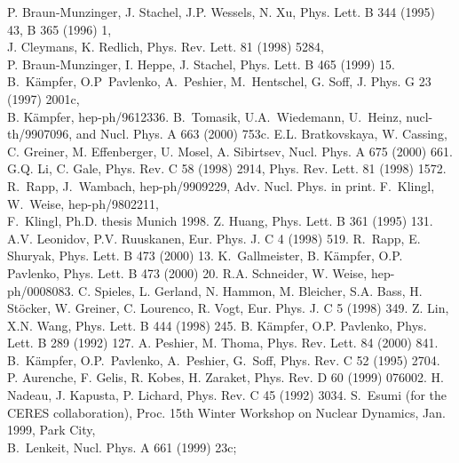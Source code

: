 \begin{thebibliography}{99}
\itemsep=0cm
P. Braun-Munzinger, J. Stachel, J.P. Wessels,
N. Xu, Phys. Lett. B 344 (1995) 43, B 365 (1996) 1,\\
J. Cleymans, K. Redlich, Phys. Rev. Lett. 81 (1998) 5284,\\
P. Braun-Munzinger, I. Heppe, J. Stachel, 
Phys. Lett. B 465 (1999) 15.
B.~K\"ampfer, O.P~Pavlenko, A.~Peshier, M.~Hentschel,
G. Soff, J. Phys. G 23 (1997) 2001c,\\
B. K\"ampfer, hep-ph/9612336.
B.~Tomasik, U.A.~Wiedemann, U.~Heinz, nucl-th/9907096,
and Nucl. Phys. A 663 (2000) 753c.
E.L. Bratkovskaya, W. Cassing, C. Greiner,
M. Effenberger, U. Mosel, A. Sibirtsev, Nucl. Phys. A 675 (2000) 661. 
 G.Q. Li, C. Gale, Phys. Rev. C 58 (1998) 2914,
Phys. Rev. Lett. 81 (1998) 1572.
R.~Rapp, J.~Wambach, hep-ph/9909229, Adv. Nucl. Phys. in print.
F.~Klingl, W.~Weise, hep-ph/9802211,\\
F.~Klingl, Ph.D. thesis Munich 1998.
Z. Huang, Phys. Lett. B 361 (1995) 131.
A.V. Leonidov, P.V. Ruuskanen, 
Eur. Phys. J. C 4 (1998) 519.
R.~Rapp, E. Shuryak, Phys. Lett. B 473 (2000) 13. 
K.~Gallmeister, B. K\"ampfer, O.P. Pavlenko, 
Phys. Lett. B 473 (2000) 20.
 R.A. Schneider, W. Weise, hep-ph/0008083.
C. Spieles, L. Gerland, N. Hammon, M. Bleicher, S.A. Bass,
H. St\"ocker, W. Greiner, C. Lourenco, R. Vogt, 
Eur. Phys. J. C 5 (1998) 349.
Z. Lin, X.N. Wang, Phys. Lett. B 444 (1998) 245. 
B. K\"ampfer, O.P. Pavlenko, Phys. Lett. B 289 (1992) 127. 
A. Peshier, M. Thoma, Phys. Rev. Lett. 84 (2000) 841.
 B.~K\"ampfer, O.P.~Pavlenko, A.~Peshier, G.~Soff,
Phys. Rev. C 52 (1995) 2704.
 P. Aurenche, F. Gelis, R. Kobes, H. Zaraket,
Phys. Rev. D 60 (1999) 076002.
 H. Nadeau, J. Kapusta, P. Lichard,
Phys. Rev. C 45 (1992) 3034.
S.~Esumi (for the CERES collaboration),
Proc. 15th Winter Workshop on Nuclear Dynamics, Jan. 1999, Park City,\\
B.~Lenkeit, Nucl. Phys. A 661 (1999) 23c; 

\end{thebibliography}
